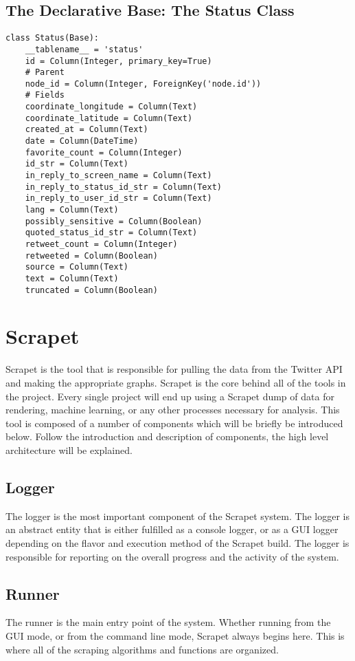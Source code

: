 \subsection{The Declarative Base: The Status Class}
\begin{lstlisting}
class Status(Base):
    __tablename__ = 'status'
    id = Column(Integer, primary_key=True)
    # Parent
    node_id = Column(Integer, ForeignKey('node.id'))
    # Fields
    coordinate_longitude = Column(Text)
    coordinate_latitude = Column(Text)
    created_at = Column(Text)
    date = Column(DateTime)
    favorite_count = Column(Integer)
    id_str = Column(Text)
    in_reply_to_screen_name = Column(Text)
    in_reply_to_status_id_str = Column(Text)
    in_reply_to_user_id_str = Column(Text)
    lang = Column(Text)
    possibly_sensitive = Column(Boolean)
    quoted_status_id_str = Column(Text)
    retweet_count = Column(Integer)
    retweeted = Column(Boolean)
    source = Column(Text)
    text = Column(Text)
    truncated = Column(Boolean)
\end{lstlisting}


\section{Scrapet}
Scrapet is the tool that is responsible for pulling the data from the Twitter API and making the appropriate graphs. Scrapet is the core behind all of the tools in the project. Every single project will end up using a Scrapet dump of data for rendering, machine learning, or any other processes necessary for analysis. This tool is composed of a number of components which will be briefly be introduced below. Follow the introduction and description of components, the high level architecture will be explained.
\subsection{Logger}
The logger is the most important component of the Scrapet system. The logger is an abstract entity that is either fulfilled as a console logger, or as a GUI logger depending on the flavor and execution method of the Scrapet build. The logger is responsible for reporting on the overall progress and the activity of the system.
\subsection{Runner}
The runner is the main entry point of the system. Whether running from the GUI mode, or from the command line mode, Scrapet always begins here. This is where all of the scraping algorithms and functions are organized.
